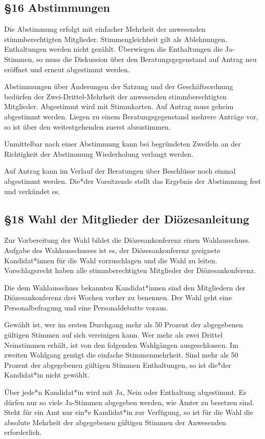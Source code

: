 \documentclass[12pt]{report}
\begin{document}
\begin{flushleft}
\subsection*{§16 Abstimmungen}
Die Abstimmung erfolgt mit einfacher Mehrheit der anwesenden stimmberechtigten Mitglieder.
Stimmengleichheit gilt als Ablehnungen. Enthaltungen werden nicht gezählt. Überwiegen die Enthaltungen die 
Ja-Stimmen, so muss die Diskussion über den Beratungsgegenstand auf Antrag neu eröffnet und erneut
abgestimmt werden.

Abstimmungen über Änderungen der Satzung und der Geschäftsordnung bedürfen der
Zwei-Drittel-Mehrheit der anwesenden stimmberechtigten Mitglieder. Abgestimmt wird mit Stimmkarten.
Auf Antrag muss geheim abgestimmt werden.
Liegen zu einem Beratungsgegenstand mehrere Anträge vor, so ist über den weitestgehenden zuerst abzustimmen.

Unmittelbar nach einer Abstimmung kann bei begründeten Zweifeln an der Richtigkeit der Abstimmung 
Wiederholung verlangt werden.

Auf Antrag kann im Verlauf der Beratungen über Beschlüsse noch einmal abgestimmt werden.
{\color{red}Die*der} Vorsitzende stellt das Ergebnis der Abstimmung fest und verkündet es.

\subsection*{§18 Wahl der Mitglieder der Diözesanleitung}
Zur Vorbereitung der Wahl bildet die Diözesankonferenz einen Wahlausschuss. Aufgabe des Wahlausschusses
ist es, der Diözesankonferenz geeignete {\color{red}Kandidat*innen} für die Wahl vorzuschlagen und die Wahl zu leiten.
Vorschlagsrecht haben alle stimmberechtigten Mitglieder der Diözesankonferenz.

Die dem Wahlausschuss bekannten {\color{red}Kandidat*innen} sind den Mitgliedern der Diözesankonferenz drei Wochen
vorher zu benennen. Der Wahl geht eine Personalbefragung und eine Personaldebatte voraus.

Gewählt ist, wer im ersten Durchgang mehr als 50 Prozent der abgegebenen gültigen Stimmen auf sich 
vereinigen kann. Wer mehr als zwei Drittel Neinstimmen erhält, ist von den folgenden Wahlgängen ausgeschlossen. 
Im zweiten Wahlgang genügt die einfache Stimmenmehrheit. Sind mehr als 50 Prozent der abgegebenen
gültigen Stimmen Enthaltungen, so ist {\color{red}die*der Kandidat*in} nicht gewählt.

Über {\color{red}jede*n Kandidat*in} wird mit Ja, Nein oder Enthaltung abgestimmt. Es dürfen nur so viele Ja-Stimmen
abgegeben werden, wie Ämter zu besetzen sind. Steht für ein Amt nur {\color{red}ein*e Kandidat*in} zur Verfügung, so ist für
die Wahl die absolute Mehrheit der abgegebenen gültigen Stimmen der Anwesenden erforderlich.


\end{flushleft}
\end{document}
